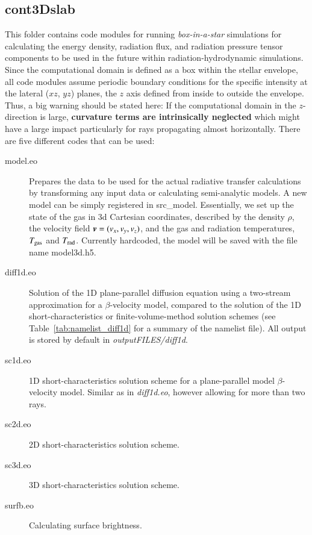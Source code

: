 \documentclass[10pt,a4paper]{article}
\begin{document}
%
\subsection{cont3Dslab}
\label{subsec:cont3d}
%
This folder contains code modules for running \textit{box-in-a-star}
simulations for calculating the energy density, radiation flux, and
radiation pressure tensor components to be used in the future within
radiation-hydrodynamic simulations. Since the computational domain is
defined as a box within the stellar envelope, all code modules assume
periodic boundary conditions for the specific intensity at the lateral
($xz$, $yz$) planes, the $z$ axis defined from inside to outside the
envelope. Thus, a big warning should be stated here: If the
computational domain in the $z$-direction is large, \textbf{curvature terms
are intrinsically neglected} which might have a large impact
particularly for rays propagating almost horizontally. There are five different codes that can be used:
\begin{description}
\item[model.eo] Prepares the data to be used for the actual radiative
  transfer calculations by transforming any input data or calculating
  semi-analytic models. A new model can be simply registered in src\_model.
  Essentially, we set up the state of the gas in 3d Cartesian coordinates, described by the density $\rho$, the
  velocity field $\boldsymbol{v}=(v_x, v_y, v_z)$, and the gas and radiation temperatures,
  $T_{\rm gas}$ and $T_{\rm rad}$. Currently hardcoded, the model will be saved with the file name model3d.h5.
  
\item[diff1d.eo] Solution of the 1D plane-parallel diffusion equation
  using a two-stream approximation for a $\beta$-velocity model,
  compared to the solution of the 1D short-characteristics or
  finite-volume-method solution schemes (see Table~\ref{tab:namelist_diff1d} for a summary of the namelist file).
  All output is stored by default in \textit{outputFILES/diff1d}.
\item[sc1d.eo] 1D short-characteristics solution scheme for a
  plane-parallel model $\beta$-velocity model. Similar as in
  \textit{diff1d.eo}, however allowing for more than two rays.
\item[sc2d.eo] 2D short-characteristics solution scheme.
\item[sc3d.eo] 3D short-characteristics solution scheme.
\item[surfb.eo] Calculating surface brightness.
\end{description}
\end{document}

